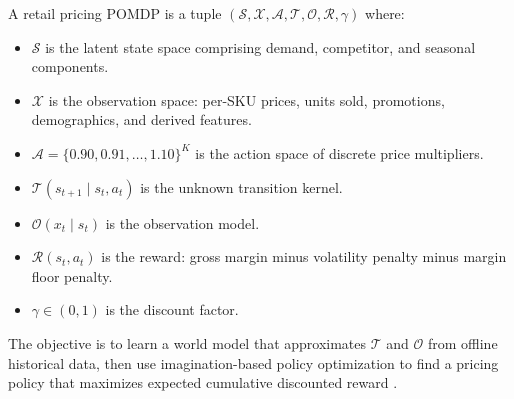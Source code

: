 \begin{definition}
\label{def:pomdp}
A retail pricing POMDP is a tuple $(\mathcal{S}, \mathcal{X}, \mathcal{A}, \mathcal{T}, \mathcal{O}, \mathcal{R}, \gamma)$ where:
\begin{itemize}[leftmargin=*]
\item $\mathcal{S}$ is the latent state space comprising demand, competitor, and seasonal components.
\item $\mathcal{X}$ is the observation space: per-SKU prices, units sold, promotions, demographics, and derived features.
\item $\mathcal{A} = \{0.90, 0.91, \ldots, 1.10\}^K$ is the action space of discrete price multipliers.
\item $\mathcal{T}(s_{t+1} \mid s_t, a_t)$ is the unknown transition kernel.
\item $\mathcal{O}(x_t \mid s_t)$ is the observation model.
\item $\mathcal{R}(s_t, a_t)$ is the reward: gross margin minus volatility penalty minus margin floor penalty.
\item $\gamma \in (0, 1)$ is the discount factor.
\end{itemize}
\end{definition}

The objective is to learn a world model that approximates $\mathcal{T}$ and $\mathcal{O}$ from offline historical data, then use imagination-based policy optimization to find a pricing policy that maximizes expected cumulative discounted reward \citep{sutton2018reinforcement, hafner2023dreamerv3}.

